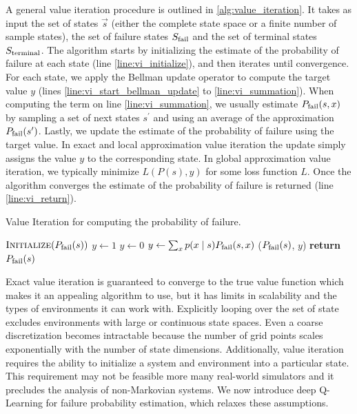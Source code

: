 A general value iteration procedure is outlined in \cref{alg:value_iteration}. It takes as input the set of states $\vec{s}$ (either the complete state space or a finite number of sample states), the set of failure states $S_{\rm fail}$ and the set of terminal states $S_{\rm terminal}$. The algorithm starts by initializing the estimate of the probability of failure at each state (line \ref{line:vi_initialize}), and then iterates until convergence. For each state, we apply the Bellman update operator to compute the target value $y$ (lines \ref{line:vi_start_bellman_update} to \ref{line:vi_summation}). When computing the term on line \ref{line:vi_summation}, we usually estimate $P_{\rm fail}(s, x)$ by sampling a set of next states $s^\prime$ and using an average of the approximation $P_{\rm fail}(s^\prime)$. Lastly, we update the estimate of the probability of failure using the target value. In exact and local approximation value iteration the update simply assigns the value $y$ to the corresponding state. In global approximation value iteration, we typically minimize $L(P(s), y)$ for some loss function $L$. Once the algorithm converges the estimate of the probability of failure is returned (line \ref{line:vi_return}). 

\begin{algorithm}
\caption{Value Iteration for computing the probability of failure.} \label{alg:value_iteration}
\begin{algorithmic}[1]
        \State $\textproc{Initialize}(P_{\rm fail}(s))$ \label{line:vi_initialize}
        \Loop
                 \label{line:vi_start_bellman_update}
                    \State $y \gets 1$
                    \State $y \gets 0$
                \Else
                    \State $y \gets \sum_x p(x \mid s) P_{\rm fail}(s,x)$ \label{line:vi_summation}
                \EndIf
                \State {}($P_{\rm fail}(s)$, $y$) \label{line:vi_update}
            \EndFor
        \EndLoop
        \State \textbf{return} $P_{\rm fail}(s)$ \label{line:vi_return}
    \EndFunction
\end{algorithmic}
\end{algorithm}

Exact value iteration is guaranteed to converge to the true value function which makes it an appealing algorithm to use, but it has limits in scalability and the types of environments it can work with. Explicitly looping over the set of state excludes environments with large or continuous state spaces. Even a coarse discretization becomes intractable because the number of grid points scales exponentially with the number of state dimensions. Additionally, value iteration requires the ability to initialize a system and environment into a particular state. This requirement may not be feasible more many real-world simulators and it precludes the analysis of non-Markovian systems. We now introduce deep Q-Learning for failure probability estimation, which relaxes these assumptions.


